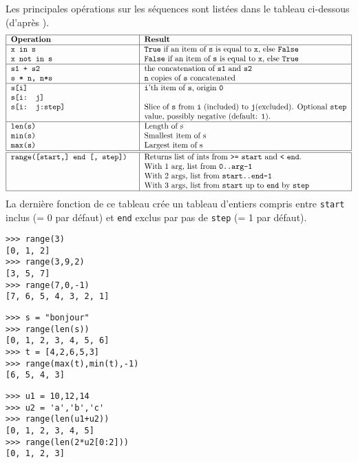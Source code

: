 \noindent Les principales opérations sur les séquences sont listées 
dans le tableau ci-dessous (d'après \cite{gruet})\label{cite:gruet2}.
$$\begin{tabular}{|l|p{9cm}|}
\hline 
\makebox[5.5cm][l]{\bf Operation} &	\bf Result 	\\
\hline
\tt x in s      & {\tt True} if an item of {\tt s} is equal to {\tt x}, else {\tt False} \\ 	
\tt x not in s 	& {\tt False} if an item of {\tt s} is equal to {\tt x}, else {\tt True}\\
\hline 	
\tt s1 + s2 	& the concatenation of {\tt s1} and {\tt s2}\\ 	 
\tt s * n, n*s 	& {\tt n} copies of {\tt s} concatenated \\	
\hline
\tt s[i] 	& {\tt i}'th item of {\tt s}, origin {\tt 0}\\ 	
\tt s[i: j]     & \\
\tt s[i: j:step]& Slice of {\tt s} from {\tt i} (included) to {\tt j}(excluded). 
                  Optional {\tt step} value, possibly negative (default: {\tt 1}). \\	
\hline
\tt len(s) 	& Length of s \\	 
\tt min(s) 	& Smallest item of s \\	
\tt max(s) 	& Largest item of s \\
\hline
\hline
\tt range([start,] end [, step]) & Returns list of ints from {\tt >=} {\tt start} and {\tt <} {\tt end}.\newline
	With 1 arg, list from {\tt 0..arg-1}\newline
	With 2 args, list from {\tt start..end-1}\newline
	With 3 args, list from {\tt start} up to {\tt end} by {\tt step}\\
\hline
\end{tabular}$$
La dernière fonction de ce tableau crée un tableau d'entiers compris entre {\tt start} inclus
(= 0 par défaut) et {\tt end} exclus par pas de {\tt step} (= 1 par défaut).

\begin{py}{5cm}
\begin{verbatim}
>>> range(3)
[0, 1, 2]
>>> range(3,9,2)
[3, 5, 7]
>>> range(7,0,-1)
[7, 6, 5, 4, 3, 2, 1]
\end{verbatim}
\end{py}
\hfill
\begin{py}{5cm}
\begin{verbatim}
>>> s = "bonjour"
>>> range(len(s))
[0, 1, 2, 3, 4, 5, 6]
>>> t = [4,2,6,5,3]
>>> range(max(t),min(t),-1)
[6, 5, 4, 3]
\end{verbatim}
\end{py}
\hfill
\begin{py}{5cm}
\begin{verbatim}
>>> u1 = 10,12,14
>>> u2 = 'a','b','c'
>>> range(len(u1+u2))
[0, 1, 2, 3, 4, 5]
>>> range(len(2*u2[0:2]))
[0, 1, 2, 3]
\end{verbatim}
\end{py}
\vspace*{1mm}

